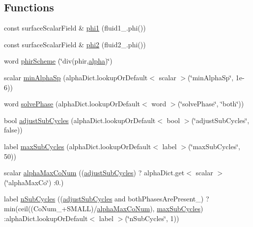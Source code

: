 \subsection*{Functions}
\begin{DoxyCompactItemize}
\item 
const surface\+Scalar\+Field \& \hyperlink{solveAlphaMULES_8H_a56f7cc5336f24e776556c927f6a53a15}{phi1} (fluid1\+\_\+.\+phi())
\item 
const surface\+Scalar\+Field \& \hyperlink{solveAlphaMULES_8H_ae4c81f549c4d3c3eca025cef5736eae8}{phi2} (fluid2\+\_\+.\+phi())
\item 
word \hyperlink{solveAlphaMULES_8H_a1712c92d5830c224e39610db811264db}{phir\+Scheme} (\char`\"{}div(phir,\hyperlink{UEqn__1pl_8H_a7fe02434a19f3e00e927f32adcbb193b}{alpha})\char`\"{})
\item 
scalar \hyperlink{solveAlphaMULES_8H_afe2a2c222a7ebeed80fcc8464bdd2cd2}{min\+Alpha\+Sp} (alpha\+Dict.\+lookup\+Or\+Default$<$ scalar $>$(\char`\"{}min\+Alpha\+Sp\char`\"{}, 1e-\/6))
\item 
word \hyperlink{solveAlphaMULES_8H_a6b6b670db65a241e294cd39d06b05192}{solve\+Phase} (alpha\+Dict.\+lookup\+Or\+Default$<$ word $>$(\char`\"{}solve\+Phase\char`\"{}, \char`\"{}both\char`\"{}))
\item 
bool \hyperlink{solveAlphaMULES_8H_ac92bd5ad9d5fec94d631acbb380404e0}{adjust\+Sub\+Cycles} (alpha\+Dict.\+lookup\+Or\+Default$<$ bool $>$(\char`\"{}adjust\+Sub\+Cycles\char`\"{}, false))
\item 
label \hyperlink{solveAlphaMULES_8H_a290130a8990b5bd2767ef1f656325e56}{max\+Sub\+Cycles} (alpha\+Dict.\+lookup\+Or\+Default$<$ label $>$(\char`\"{}max\+Sub\+Cycles\char`\"{}, 50))
\item 
scalar \hyperlink{solveAlphaMULES_8H_a23fab721ca956091a1921746c4da0216}{alpha\+Max\+Co\+Num} ((\hyperlink{solveAlphaMULES_8H_ac92bd5ad9d5fec94d631acbb380404e0}{adjust\+Sub\+Cycles}) ? alpha\+Dict.\+get$<$ scalar $>$(\char`\"{}alpha\+Max\+Co\char`\"{}) \+:0.)
\item 
label \hyperlink{solveAlphaMULES_8H_a789731aed114e29f0b40ddbefaf14c31}{n\+Sub\+Cycles} ((\hyperlink{solveAlphaMULES_8H_ac92bd5ad9d5fec94d631acbb380404e0}{adjust\+Sub\+Cycles} and both\+Phases\+Are\+Present\+\_\+) ? min(ceil((Co\+Num\+\_\++S\+M\+A\+LL)/\hyperlink{solveAlphaMULES_8H_a23fab721ca956091a1921746c4da0216}{alpha\+Max\+Co\+Num}), \hyperlink{solveAlphaMULES_8H_a290130a8990b5bd2767ef1f656325e56}{max\+Sub\+Cycles}) \+:alpha\+Dict.\+lookup\+Or\+Default$<$ label $>$(\char`\"{}n\+Sub\+Cycles\char`\"{}, 1))
\end{DoxyCompactItemize}
